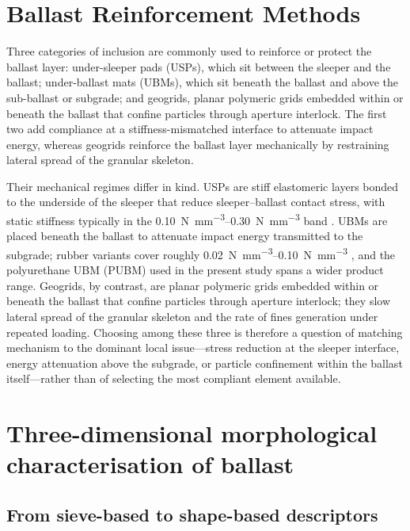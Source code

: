 \section{Ballast Reinforcement Methods}
\label{sec:lit-reinforcement}

Three categories of inclusion are commonly used to reinforce or protect
the ballast layer: under-sleeper pads (\glspl{USP}), which sit between the
sleeper and the ballast; under-ballast mats (\glspl{UBM}), which sit
beneath the ballast and above the sub-ballast or subgrade; and geogrids,
planar polymeric grids embedded within or beneath the ballast that
confine particles through aperture interlock. The first two add
compliance at a stiffness-mismatched interface to attenuate impact
energy, whereas geogrids reinforce the ballast layer mechanically by
restraining lateral spread of the granular skeleton.

Their mechanical regimes differ in kind. \glspl{USP} are stiff elastomeric
layers bonded to the underside of the sleeper that reduce sleeper--ballast
contact stress, with static stiffness typically in the
\SIrange{0.10}{0.30}{\newton\per\milli\metre\cubed} band
\citep{Jayasuriya2019}. \glspl{UBM} are placed beneath the ballast to
attenuate impact energy transmitted to the subgrade; rubber variants cover
roughly \SIrange{0.02}{0.10}{\newton\per\milli\metre\cubed}
\citep{Navaratnarajah2017, Ngo2019}, and the polyurethane \gls{UBM}
(\gls{PUBM}) used in the present study spans a wider product range.
Geogrids, by contrast, are planar polymeric grids embedded within or
beneath the ballast that confine particles through aperture interlock;
they slow lateral spread of the granular skeleton and the rate of fines
generation under repeated loading. Choosing among these three is therefore
a question of matching mechanism to the dominant local issue---stress
reduction at the sleeper interface, energy attenuation above the
subgrade, or particle confinement within the ballast itself---rather than
of selecting the most compliant element available.

\section{Three-dimensional morphological characterisation of ballast}
\label{sec:lit-morphology}

\subsection{From sieve-based to shape-based descriptors}
\label{sec:lit-sieve-to-shape}

